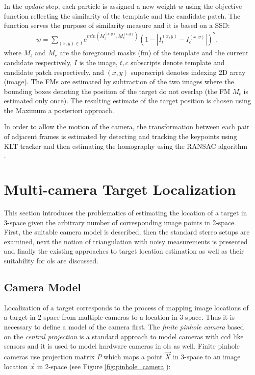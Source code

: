 In the \textit{update} step, each particle is assigned a new weight $w$ using the objective function reflecting the similarity of the template and the candidate patch. The function serves the purpose of similarity measure and it is based on a SSD:
\begin{align} \label{eq:bgfg_distance_function}
	w = \sum_{(x,y) \in I}{e^{min(M_{t}^{(x,y)}, M_{c}^{(x,y)})}(1 - |I_{t}^{(x,y)} - I_{c}^{(x,y)}|)^{2}},
\end{align}
where $M_{t}$ and $M_{c}$ are the foreground masks (\gls{fm}) of the template and the current candidate respectively, $I$ is the image, $t, c$ subscripts denote template and candidate patch respectively, and $(x,y)$ superscript denotes indexing 2D array (image). The FMs are estimated by subtraction of the two images where the bounding boxes denoting the position of the target do not overlap (the FM $M_{t}$ is estimated only once). The resulting estimate of the target position is chosen using the Maximum a posteriori approach.

In order to allow the motion of the camera, the transformation between each pair of adjacent frames is estimated by detecting and tracking the keypoints using KLT tracker \cite{Tomasi91detectionand} and then estimating the homography using the RANSAC algorithm \cite{Hartley:2003:MVG:861369}.

\section{Multi-camera Target Localization} \label{txt:multi_camera_target_localization}

This section introduces the problematics of estimating the location of a target in 3-space given the arbitrary number of corresponding image points in 2-space. First, the suitable camera model is described, then the standard stereo setups are examined, next the notion of triangulation with noisy measurements is presented and finally the existing approaches to target location estimation as well as their suitability for \gls{ols} are discussed.

\subsection{Camera Model}

Localization of a target corresponds to the process of mapping image locations of a target in 2-space from multiple cameras to a location in 3-space. Thus it is necessary to define a model of the camera first. The \textit{finite pinhole camera} based on the \textit{central projection} is a standard approach to model cameras with \gls{ccd} like sensors \cite{Hartley:2003:MVG:861369} and it is used to model hardware cameras in \gls{ols} as well. Finite pinhole cameras use projection matrix $P$ which maps a point $\vec{X}$ in 3-space to an image location $\vec{x}$ in 2-space (see Figure \ref{fig:pinhole_camera}):

